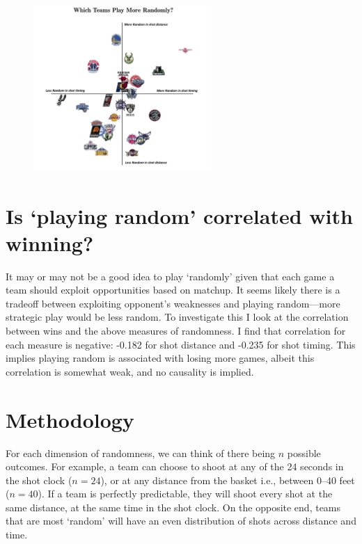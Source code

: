 \documentclass[a4paper, 11pt]{article}
\begin{document}
\begin{figure}[!htpb]
  \centering \includegraphics[width=0.6\textwidth]{../plots_tables/randomginiplot.jpg}
  \caption{}\label{fig:randomgini}
\end{figure}




\section*{Is `playing random' correlated with winning?}
It may or may not be a good idea to play `randomly' given that each game a team should exploit opportunities based on matchup. It seems likely there is a tradeoff between exploiting opponent's weaknesses and playing random---more strategic play would be less random. To investigate this I look at the correlation between wins and the above measures of randomness. I find that correlation for each measure is negative: -0.182 for shot distance and -0.235 for shot timing. This implies playing random is associated with losing more games, albeit this correlation is somewhat weak, and no causality is implied.

\section*{Methodology}
For each dimension of randomness, we can think of there being $n$ possible outcomes. For example, a team can choose to shoot at any of the 24 seconds in the shot clock ($n=24$), or at any distance from the basket i.e., between 0--40 feet ($n=40$). If a team is perfectly predictable, they will shoot every shot at the same distance, at the same time in the shot clock. On the opposite end, teams that are most `random' will have an even distribution of shots across distance and time.
\end{document}
